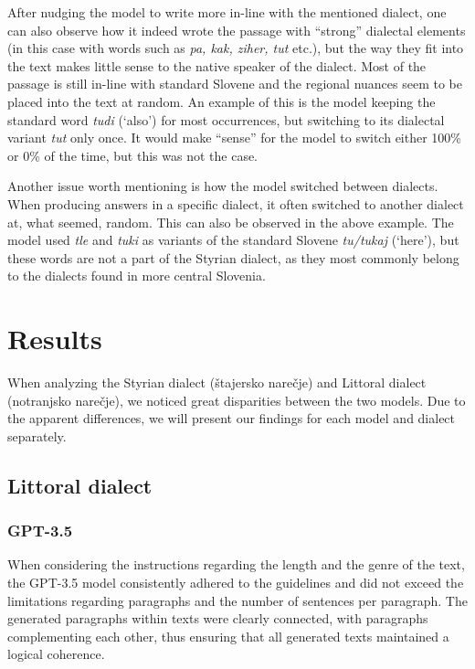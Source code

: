 \documentclass[fleqn,moreauthors,10pt]{ds_report}
\begin{document}
    After nudging the model to write more in-line with the mentioned dialect, one can also observe how it indeed wrote the passage with “strong” dialectal elements (in this case with words such as \textit{pa, kak, ziher, tut }etc.), but the way they fit into the text makes little sense to the native speaker of the dialect. Most of the passage is still in-line with standard Slovene and the regional nuances seem to be placed into the text at random. An example of this is the model keeping the standard word \textit{tudi }(‘also’) for most occurrences, but switching to its dialectal variant \textit{tut} only once. It would make “sense” for the model to switch either 100\% or 0\% of the time, but this was not the case.

    Another issue worth mentioning is how the model switched between dialects. When producing answers in a specific dialect, it often switched to another dialect at, what seemed, random. This can also be observed in the above example. The model used \textit{tle }and \textit{tuki} as variants of the standard Slovene \textit{tu/tukaj }(‘here’), but these words are not a part of the Styrian dialect, as they most commonly belong to the dialects found in more central Slovenia.




\section{Results}

When analyzing the Styrian dialect (štajersko narečje) and Littoral dialect (notranjsko narečje), we noticed great disparities between the two models. Due to the apparent differences, we will present our findings for each model and dialect separately.

\subsection{Littoral dialect}
\vspace{\baselineskip}
\subsubsection{GPT-3.5}

    When considering the instructions regarding the length and the genre of the text, the GPT-3.5 model consistently adhered to the guidelines and did not exceed the limitations regarding paragraphs and the number of sentences per paragraph. The generated paragraphs within texts were clearly connected, with paragraphs complementing each other, thus ensuring that all generated texts maintained a logical coherence. 
\end{document}
